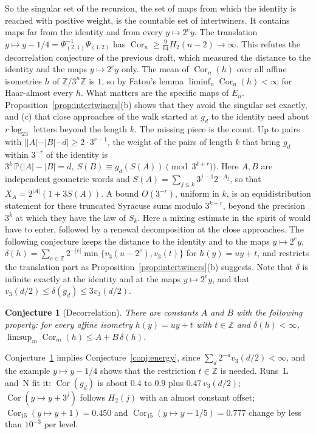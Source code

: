 \documentclass[12pt]{amsart}
\newtheorem{conjecture}{Conjecture}
\theoremstyle{definition}
\theoremstyle{remark}
\newcommand{\Z}{\mathbb{Z}}
\begin{document}
So the singular set of the recursion, the set of maps from which the identity is reached with positive weight, is the countable set of intertwiners. It contains maps far from the identity and from every $y\mapsto2^ey$. The translation $y\mapsto y-1/4=\Psi_{(2,1)}^{-1}\Psi_{(1,2)}$ has $\operatorname{Cor}_n\ge\frac9{64}H_2(n-2)\to\infty$. This refutes the decorrelation conjecture of the previous draft, which measured the distance to the identity and the maps $y\mapsto2^ey$ only. The mean of $\operatorname{Cor}_n(h)$ over all affine isometries $h$ of $\Z/3^n\Z$ is $1$, so by Fatou's lemma $\liminf_n\operatorname{Cor}_n(h)<\infty$ for Haar-almost every $h$. What matters are the specific maps of $E_n$. Proposition~\ref{prop:intertwiners}(b) shows that they avoid the singular set exactly, and (c) that close approaches of the walk started at $g_d$ to the identity need about $r\log_23$ letters beyond the length $k$. The missing piece is the count. Up to pairs with $||A|-|B|-d|\ge2\cdot3^{r-1}$, the weight of the pairs of length $k$ that bring $g_d$ within $3^{-r}$ of the identity is $3^k\,\mathbb P\bigl(|A|-|B|=d,\ S(B)\equiv g_d(S(A))\pmod{3^{k+r}}\bigr)$. Here $A,B$ are independent geometric words and $S(A)=\sum_{j\le k}3^{j-1}2^{-A_j}$, so that $X_A=2^{|A|}(1+3S(A))$. A bound $O(3^{-r})$, uniform in $k$, is an equidistribution statement for these truncated Syracuse sums modulo $3^{k+r}$, beyond the precision $3^k$ at which they have the law of $S_k$. Here a mixing estimate in the spirit of \cite[Propositions~1.14, 1.17]{Tao_2022} would have to enter, followed by a renewal decomposition at the close approaches. The following conjecture keeps the distance to the identity and to the maps $y\mapsto2^ey$, $\delta(h)=\sum_{e\in\Z}2^{-|e|}\min\{v_3(u-2^e),v_3(t)\}$ for $h(y)=uy+t$, and restricts the translation part as Proposition~\ref{prop:intertwiners}(b) suggests. Note that $\delta$ is infinite exactly at the identity and at the maps $y\mapsto2^ey$, and that $v_3(d/2)\le\delta(g_d)\le3v_3(d/2)$.

\begin{conjecture}[Decorrelation]
\label{conj:decor}
There are constants $A$ and $B$ with the following property: for every affine isometry $h(y)=uy+t$ with $t\in\Z$ and $\delta(h)<\infty$, $\limsup_m\operatorname{Cor}_m(h)\le A+B\,\delta(h)$.
\end{conjecture}

Conjecture~\ref{conj:decor} implies Conjecture~\ref{conj:energy}, since $\sum_d2^{-d}v_3(d/2)<\infty$, and the example $y\mapsto y-1/4$ shows that the restriction $t\in\Z$ is needed. Runs~L and~N fit it: $\operatorname{Cor}(g_d)$ is about $0.4$ to $0.9$ plus $0.47\,v_3(d/2)$; $\operatorname{Cor}(y\mapsto y+3^j)$ follows $H_2(j)$ with an almost constant offset; $\operatorname{Cor}_{15}(y\mapsto y+1)=0.450$ and $\operatorname{Cor}_{15}(y\mapsto y-1/5)=0.777$ change by less than $10^{-3}$ per level.
\end{document}
